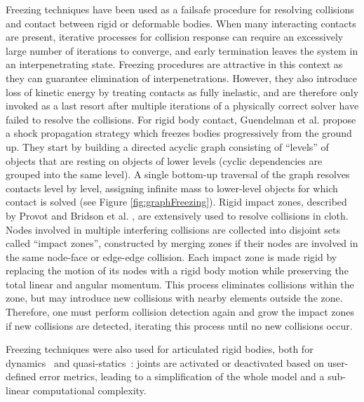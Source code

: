 Freezing techniques have been used as a failsafe procedure for resolving collisions and contact between rigid or deformable bodies.
When many interacting contacts are present, iterative processes for collision response can require an excessively large number of iterations to converge, and early termination leaves the system in an interpenetrating state.
Freezing procedures are attractive in this context as they can guarantee elimination of interpenetrations.
However, they also introduce loss of kinetic energy by treating contacts as fully inelastic, and are therefore only invoked as a last resort after multiple iterations of a physically correct solver have failed to resolve the collisions.
For rigid body contact, Guendelman et al. \cite{Guendelman2003} propose a shock propagation strategy which freezes bodies progressively from the ground up.
They start by building a directed acyclic graph consisting of ``levels'' of objects that are resting on objects of lower levels (cyclic dependencies are grouped into the same level).
A single bottom-up traversal of the graph resolves contacts level by level, assigning infinite mass to lower-level objects for which contact is solved (see Figure \ref{fig:graphFreezing}).
Rigid impact zones, described by Provot \cite{Provot1997} and Bridson et al. \cite{Bridson2002}, are extensively used to resolve collisions in cloth.
Nodes involved in multiple interfering collisions are collected into disjoint sets called ``impact zones'', constructed by merging zones if their nodes are involved in the same node-face or edge-edge collision.
Each impact zone is made rigid by replacing the motion of its nodes with a rigid body motion while preserving the total linear and angular momentum.
This process eliminates collisions within the zone, but may introduce new collisions with nearby elements outside the zone.
Therefore, one must perform collision detection again and grow the impact zones if new collisions are detected, iterating this process until no new collisions occur.

Freezing techniques were also used for articulated rigid bodies, both for dynamics~\cite{Redon2005} and quasi-statics~\cite{Redon2006}: joints are activated or deactivated based on user-defined error metrics, leading to a simplification of the whole model and a sub-linear computational complexity.

